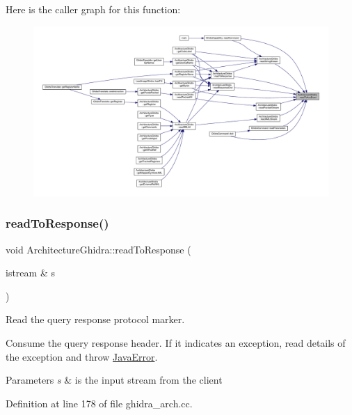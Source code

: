 Here is the caller graph for this function\+:
\nopagebreak
\begin{figure}[H]
\begin{center}
\leavevmode
\includegraphics[width=350pt]{class_architecture_ghidra_a3132c5fe1bb675952197aa4eafcf298e_icgraph}
\end{center}
\end{figure}
\mbox{\label{class_architecture_ghidra_a3b18a5a9e669ac8adabe9da47d2aaddf}} 
\subsubsection{\texorpdfstring{readToResponse()}{readToResponse()}}
{\footnotesize\ttfamily void Architecture\+Ghidra\+::read\+To\+Response (\begin{DoxyParamCaption}\item[{istream \&}]{s }\end{DoxyParamCaption})\hspace{0.3cm}{\ttfamily [static]}}



Read the query response protocol marker. 

Consume the query response header. If it indicates an exception, read details of the exception and throw \mbox{\hyperlink{struct_java_error}{Java\+Error}}. 
\begin{DoxyParams}{Parameters}
{\em s} & is the input stream from the client \\
\hline
\end{DoxyParams}


Definition at line 178 of file ghidra\+\_\+arch.\+cc.

